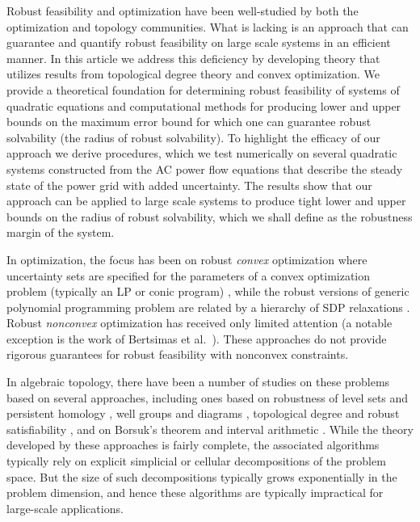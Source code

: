 Robust feasibility and optimization have been well-studied by both the optimization and topology communities. 
What is lacking is an approach that can guarantee and quantify robust feasibility on large scale systems in an efficient manner. 
In this article we address this deficiency by developing theory that utilizes results from topological degree theory and convex optimization. 
We provide a theoretical foundation for determining robust feasibility of systems of quadratic equations and computational methods for producing lower and upper bounds on the maximum error bound for which one can guarantee robust solvability (the radius of robust solvability). 
To highlight the efficacy of our approach we derive procedures, which we test numerically on several quadratic systems constructed from the AC power flow equations that describe the steady state of the power grid with added uncertainty. 
The results show that our approach can be applied to large scale systems to produce tight lower and upper bounds on the radius of robust solvability, which we shall define as the robustness margin of the system.

In optimization, the focus has been on robust \emph{convex} optimization where uncertainty sets are specified for the parameters of a convex optimization problem (typically an LP or conic program) \cite{ben2009robust}, while the robust versions of generic polynomial programming problem are related by a hierarchy of SDP relaxations \cite{Lasserre2006,Lasserre2011}.
Robust \emph{nonconvex} optimization has received only limited attention (a notable exception is the work of Bertsimas et al.~\cite{BeNoTe2010}).
These approaches do not provide rigorous guarantees for robust feasibility with nonconvex constraints.

In algebraic topology, there have been a number of studies on these problems based on several approaches, including ones based on robustness of level sets and persistent homology \cite{BeEdMoPa2010,EdMoPa2011}, well groups and diagrams \cite{ChSkPa2012,FrKr2016well,FrKr2016pers}, topological degree and robust satisfiability \cite{FrKr2015,FrKrWa2016},  and on Borsuk's theorem and interval arithmetic \cite{FrRa2015,FrHoLa2007,FrLa2005}.
While the theory developed by these approaches is fairly complete, the associated algorithms typically rely on explicit simplicial or cellular decompositions of the problem space.
But the size of such decompositions typically grows exponentially in the problem dimension, and hence these algorithms are typically impractical for large-scale applications.

